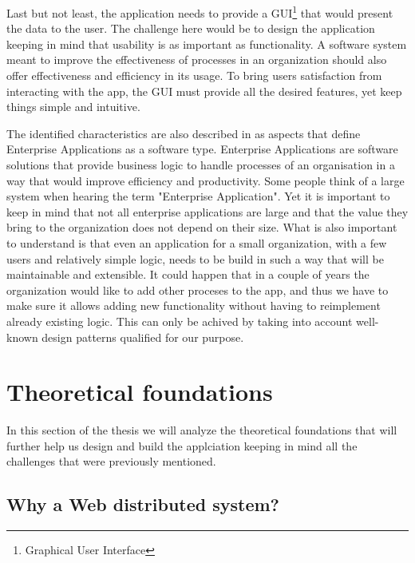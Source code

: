 Last but not least, the application needs to provide a GUI\footnote{Graphical User Interface} that would present the data to the user. The challenge here would be to design the application keeping in mind that usability is as important as functionality. A software system meant to improve the effectiveness of processes in an organization should also offer effectiveness and efficiency in its usage. To bring users satisfaction from interacting with the app, the GUI must provide all the desired features, yet keep things simple and intuitive.

The identified characteristics are also described in \cite{patternsOfEnterpriseApplicationArchitecture} as aspects that define Enterprise Applications as a software type. Enterprise Applications are software solutions that provide business logic to handle processes of an organisation in a way that would improve efficiency and productivity. Some people think of a large system when hearing the term "Enterprise Application". Yet it is important to keep in mind that not all enterprise applications are large and that the value they bring to the organization does not depend on their size. What is also important to understand is that even an application for a small organization, with a few users and relatively simple logic, needs to be build in such a way that will be maintainable and extensible. It could happen that in a couple of years the organization would like to add other proceses to the app, and thus we have to make sure it allows adding new functionality without having to reimplement already existing logic. This can only be achived by taking into account well-known design patterns qualified for our purpose.



\section{Theoretical foundations}
\label{section:theoreticalFoundations}

In this section of the thesis we will analyze the theoretical foundations that will further help us design and build the applciation keeping in mind all the challenges that were previously mentioned.

\subsection{Why a Web distributed system?}
\label{subsection:whyAWebDistributedSystem}

